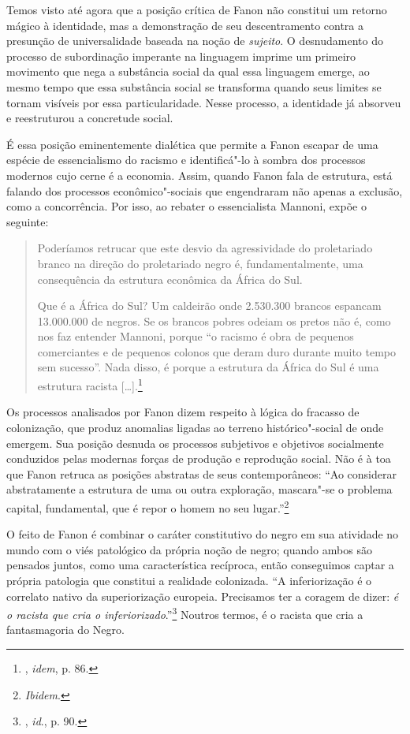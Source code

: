 Temos visto até agora que a posição crítica de Fanon não constitui um
retorno mágico à identidade, mas a demonstração de seu descentramento
contra a presunção de universalidade baseada na noção de \emph{sujeito}.
O desnudamento do processo de subordinação imperante na linguagem
imprime um primeiro movimento que nega a substância social da qual essa
linguagem emerge, ao mesmo tempo que essa substância social se
transforma quando seus limites se tornam visíveis por essa
particularidade. Nesse processo, a identidade já absorveu e reestruturou
a concretude social.

É essa posição eminentemente dialética que permite a Fanon escapar de
uma espécie de essencialismo do racismo e identificá"-lo à sombra dos
processos modernos cujo cerne é a economia. Assim, quando Fanon fala de
estrutura, está falando dos processos econômico"-sociais que engendraram
não apenas a exclusão, como a concorrência. Por isso, ao rebater o
essencialista Mannoni, expõe o seguinte:

\begin{quote}
Poderíamos retrucar que este desvio da agressividade do proletariado
branco na direção do proletariado negro é, fundamentalmente, uma
consequência da estrutura econômica da África do Sul.

Que é a África do Sul? Um caldeirão onde 2.530.300 brancos espancam
13.000.000 de negros. Se os brancos pobres odeiam os pretos não é, como
nos faz entender Mannoni, porque ``o racismo é obra de pequenos
comerciantes e de pequenos colonos que deram duro durante muito tempo
sem sucesso''. Nada disso, é porque a estrutura da África do Sul é uma
estrutura racista [\ldots{}].\footnote{, \emph{idem}, p. 86.}
\end{quote}

Os processos analisados por Fanon dizem respeito à lógica do fracasso de
colonização, que produz anomalias ligadas ao terreno histórico"-social de
onde emergem. Sua posição desnuda os processos subjetivos e objetivos
socialmente conduzidos pelas modernas forças de produção e reprodução
social. Não é à toa que Fanon retruca as posições abstratas de seus
contemporâneos: ``Ao considerar abstratamente a estrutura de uma ou
outra exploração, mascara"-se o problema capital, fundamental, que é
repor o homem no seu lugar.''\footnote{\emph{Ibidem}.}

O feito de Fanon é combinar o caráter constitutivo do negro em sua
atividade no mundo com o viés patológico da própria noção de negro;
quando ambos são pensados juntos, como uma característica recíproca,
então conseguimos captar a própria patologia que constitui a realidade
colonizada. ``A inferiorização é o correlato nativo da superiorização
europeia. Precisamos ter a coragem de dizer: \emph{é o racista que cria
o inferiorizado}.''\footnote{, \emph{id}., p. 90.} Noutros termos, é o
racista que cria a fantasmagoria do Negro.

